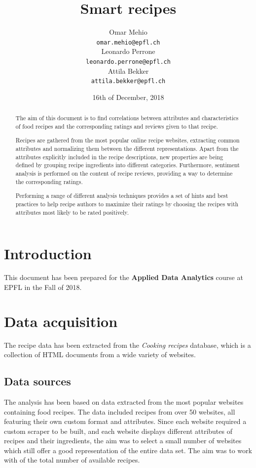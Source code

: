 \documentclass[11pt]{article}
\title{Smart recipes}
\author{Omar Mehio \\
  {\tt\small omar.mehio@epfl.ch} \\\And
  Leonardo Perrone \\
  {\tt\small leonardo.perrone@epfl.ch} \\\And
  Attila Bekker \\
  {\tt\small attila.bekker@epfl.ch} \\}
\date{16th of December, 2018}
\begin{document}
\maketitle
\begin{abstract}
  The aim of this document is to find correlations between attributes and characteristics of food recipes and the corresponding ratings and reviews given to that recipe.
  
  Recipes are gathered from the most popular online recipe websites, extracting common attributes and normalizing them between the different representations. Apart from the attributes explicitly included in the recipe descriptions, new properties are being defined by grouping recipe ingredients into different categories. Furthermore, sentiment analysis is performed on the content of recipe reviews, providing a way to determine the corresponding ratings.
  
  Performing a range of different analysis techniques provides a set of hints and best practices to help recipe authors to maximize their ratings by choosing the recipes with attributes most likely to be rated positively.
\end{abstract}

\section{Introduction}

This document has been prepared for the \textbf{Applied Data Analytics} course at EPFL in the Fall of 2018.

\section{Data acquisition}

The recipe data has been extracted from the \textit{Cooking recipes} database, which is a collection of HTML documents from a wide variety of websites.

\subsection{Data sources}

The analysis has been based on data extracted from the most popular websites containing food recipes. The data included recipes from over 50 websites, all featuring their own custom format and attributes. Since each website required a custom scraper to be built, and each website displays different attributes of recipes and their ingredients, the aim was to select a small number of websites which still offer a good representation of the entire data set. The aim was to work with  of the total number of available recipes.
\end{document}
